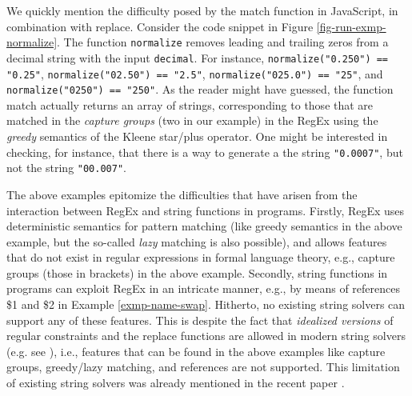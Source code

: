 \begin{example}\label{ex:normalize}
    We quickly mention the difficulty posed by the match function in JavaScript,
    in combination with replace. %
    Consider the code snippet in Figure 
    \ref{fig-run-exmp-normalize}.
 The function {\tt normalize}   removes leading and trailing zeros from a decimal string with the input %
{\tt decimal}. For instance, 
 \texttt{normalize("0.250") == "0.25"},
 \texttt{normalize("02.50") == "2.5"},
 \texttt{normalize("025.0") == "25"},
and  \texttt{normalize("0250") == "250"}. As the reader might have
    guessed, the function match actually returns an array of strings,
    corresponding to those that are matched in the \emph{capture groups} (two 
    in our example) in the RegEx using the \emph{greedy} semantics of the Kleene star/plus operator. One might be
    interested in checking, for instance, that there is a way to generate a
    the string \texttt{"0.0007"}, but not the string \texttt{"00.007"}.
\end{example}



The above examples epitomize the difficulties that have arisen from the
interaction between RegEx and string functions in programs. Firstly,
RegEx uses deterministic semantics for pattern matching (like greedy
semantics in the above example, but the so-called \emph{lazy} matching is
also possible), and allows features that do not exist in regular expressions in
formal language theory, e.g., capture groups (those in brackets) in the above
example. Secondly, string functions in programs can exploit RegEx in an
intricate manner, e.g., by means of references \$1 and \$2 in Example 
\ref{exmp-name-swap}. Hitherto, no existing string solvers
can support any of these features. This is despite the fact that \emph{idealized
versions} of regular 
constraints and the replace functions are allowed in modern string solvers
(e.g. see \cite{AbdullaACDHRR18-trau,HJLRV18,cvc4,TCJ16,YABI14,CHL+19}), i.e., 
features that can be found in the above examples like capture groups, 
greedy/lazy matching, and references are not supported.
This limitation of existing
string solvers was already mentioned in the recent paper \cite{LMK19}.

